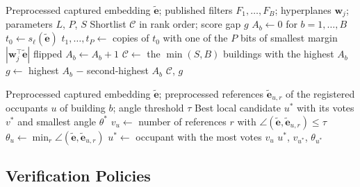 \documentclass[pdflatex,sn-mathphys-num]{sn-jnl}%
\theoremstyle{thmstyleone}%
\theoremstyle{thmstyletwo}%
\theoremstyle{thmstylethree}%
\begin{document}
\begin{algorithm}[!t]
\footnotesize
\caption{Candidate routing (\textsc{Route})}
\label{alg:route}
\begin{algorithmic}[1]
\Require Preprocessed captured embedding $\tilde{\mathbf{e}}$; published filters $F_1,\dots,F_B$; hyperplanes $\mathbf{w}_j$; parameters $L$, $P$, $S$
\Ensure Shortlist $\mathcal{C}$ in rank order; score gap $g$
\State $A_b\gets0$ for $b=1,\dots,B$ 
  \State $t_0\gets s_\ell(\tilde{\mathbf{e}})$ 
  \State $t_1,\dots,t_P\gets$ copies of $t_0$ with one of the $P$ bits of smallest margin $|\mathbf{w}_j^\top\tilde{\mathbf{e}}|$ flipped 
      \State $A_b\gets A_b+1$ 
    \EndIf
  \EndFor
\EndFor
\State $\mathcal{C}\gets$ the $\min(S,B)$ buildings with the highest $A_b$ 
\State $g\gets$ highest $A_b$ $-$ second-highest $A_b$ 
\State \Return $\mathcal{C}$, $g$
\end{algorithmic}
\end{algorithm}

\begin{algorithm}[!t]
\footnotesize
\caption{Local verification at building $b$ (\textsc{Verify})}
\label{alg:verify}
\begin{algorithmic}[1]
\Require Preprocessed captured embedding $\tilde{\mathbf{e}}$; preprocessed references $\tilde{\mathbf{e}}_{u,r}$ of the registered occupants $u$ of building $b$; angle threshold $\tau$
\Ensure Best local candidate $u^*$ with its votes $v^*$ and smallest angle $\theta^*$
  \State $v_u\gets$ number of references $r$ with $\angle(\tilde{\mathbf{e}},\tilde{\mathbf{e}}_{u,r})\leq\tau$ 
  \State $\theta_u\gets\min_r\angle(\tilde{\mathbf{e}},\tilde{\mathbf{e}}_{u,r})$ 
\EndFor
\State $u^*\gets$ occupant with the most votes $v_u$ 
\State \Return $u^*$, $v_{u^*}$, $\theta_{u^*}$
\end{algorithmic}
\end{algorithm}

\subsection{Verification Policies}
\label{subsec:verification_policies}
\end{document}
